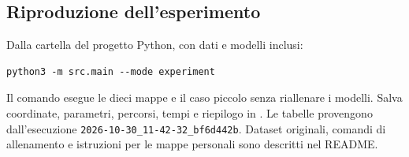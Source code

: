 \subsection*{Riproduzione dell'esperimento}

Dalla cartella del progetto Python, con dati e modelli inclusi:
\begin{verbatim}
python3 -m src.main --mode experiment
\end{verbatim}
Il comando esegue le dieci mappe e il caso piccolo senza riallenare i modelli.
Salva coordinate, parametri, percorsi, tempi e riepilogo in
. Le tabelle provengono dall'esecuzione
\texttt{2026-10-30\_11-42-32\_bf6d442b}. Dataset originali, comandi di
allenamento e istruzioni per le mappe personali sono descritti nel README.
